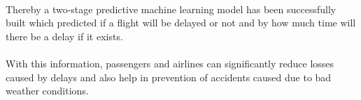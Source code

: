\documentclass[12pt,letter-paper]{article}
\begin{document}
    \paragraph{}
    Thereby a two-stage predictive machine learning model has been successfully built which predicted if a flight will be delayed or not and by how much time will there be a delay if it exists. 
    
    \paragraph{}
    With this information, passengers and airlines can significantly reduce losses caused by delays and also help in prevention of accidents caused due to bad weather conditions. 

    
\end{document}
